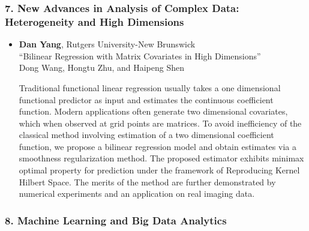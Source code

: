 \subsubsection*{7. New Advances in Analysis of Complex Data: Heterogeneity and High Dimensions}

\begin{itemize}
\item \textbf{Dan Yang}, Rutgers University-New Brunswick \\
``Bilinear Regression with Matrix Covariates in High Dimensions'' \\
Dong Wang, Hongtu Zhu, and Haipeng Shen


Traditional functional linear regression usually takes a one dimensional functional predictor as input and estimates the continuous coefficient function. Modern applications often generate two dimensional covariates, which when observed at grid points are matrices. To avoid inefficiency of the classical method involving estimation of a two dimensional coefficient function, we propose a bilinear regression model and obtain estimates via a smoothness regularization method. The proposed estimator exhibits minimax optimal property for prediction under the framework of Reproducing Kernel Hilbert Space. The merits of the method are further demonstrated by numerical experiments and an application on real imaging data. 

\end{itemize}

\subsubsection*{8. Machine Learning and Big Data Analytics}

